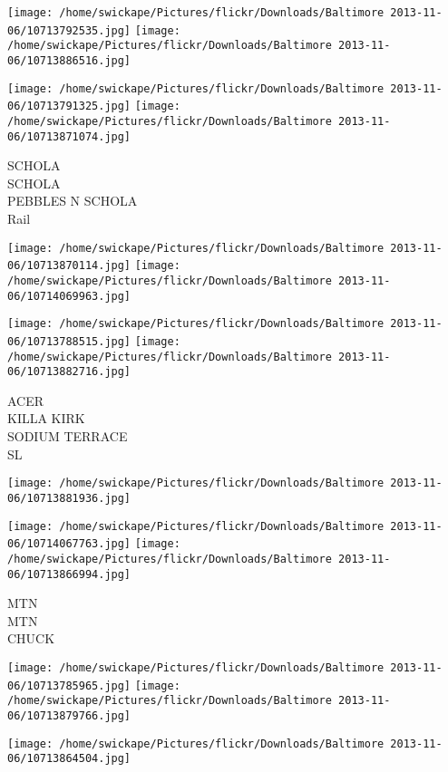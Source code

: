 \documentclass[10pt,letterpaper]{article}
\begin{document}
\texttt{[image: /home/swickape/Pictures/flickr/Downloads/Baltimore 2013-11-06/10713792535.jpg]}
\texttt{[image: /home/swickape/Pictures/flickr/Downloads/Baltimore 2013-11-06/10713886516.jpg]}

\texttt{[image: /home/swickape/Pictures/flickr/Downloads/Baltimore 2013-11-06/10713791325.jpg]}
\texttt{[image: /home/swickape/Pictures/flickr/Downloads/Baltimore 2013-11-06/10713871074.jpg]}

SCHOLA\\
SCHOLA\\
PEBBLES N SCHOLA\\
Rail\\
\pagebreak

\texttt{[image: /home/swickape/Pictures/flickr/Downloads/Baltimore 2013-11-06/10713870114.jpg]}
\texttt{[image: /home/swickape/Pictures/flickr/Downloads/Baltimore 2013-11-06/10714069963.jpg]}

\texttt{[image: /home/swickape/Pictures/flickr/Downloads/Baltimore 2013-11-06/10713788515.jpg]}
\texttt{[image: /home/swickape/Pictures/flickr/Downloads/Baltimore 2013-11-06/10713882716.jpg]}

ACER\\
KILLA KIRK\\
SODIUM TERRACE\\
SL\\
\pagebreak

\texttt{[image: /home/swickape/Pictures/flickr/Downloads/Baltimore 2013-11-06/10713881936.jpg]}

\vspace{0.25in}
\texttt{[image: /home/swickape/Pictures/flickr/Downloads/Baltimore 2013-11-06/10714067763.jpg]}
\texttt{[image: /home/swickape/Pictures/flickr/Downloads/Baltimore 2013-11-06/10713866994.jpg]}

MTN\\
MTN\\
CHUCK\\
\pagebreak

\texttt{[image: /home/swickape/Pictures/flickr/Downloads/Baltimore 2013-11-06/10713785965.jpg]}
\texttt{[image: /home/swickape/Pictures/flickr/Downloads/Baltimore 2013-11-06/10713879766.jpg]}

\texttt{[image: /home/swickape/Pictures/flickr/Downloads/Baltimore 2013-11-06/10713864504.jpg]}
\end{document}
